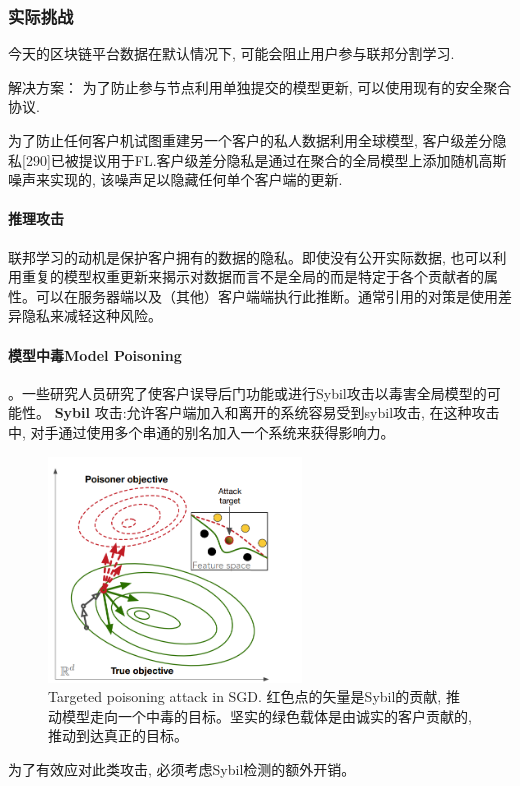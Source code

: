 \documentclass[a4paper]{article}
\begin{document}
\paragraph{}
 
    \subsubsection{实际挑战}

今天的区块链平台数据在默认情况下, 可能会阻止用户参与联邦分割学习.

解决方案：
为了防止参与节点利用单独提交的模型更新, 可以使用现有的安全聚合协议.

为了防止任何客户机试图重建另一个客户的私人数据利用全球模型, 客户级差分隐私[290]已被提议用于FL.客户级差分隐私是通过在聚合的全局模型上添加随机高斯噪声来实现的, 该噪声足以隐藏任何单个客户端的更新.

\paragraph{推理攻击} 联邦学习的动机是保护客户拥有的数据的隐私。即使没有公开实际数据, 也可以利用重复的模型权重更新来揭示对数据而言不是全局的而是特定于各个贡献者的属性。可以在服务器端以及（其他）客户端端执行此推断。通常引用的对策是使用差异隐私来减轻这种风险。

\paragraph{模型中毒Model Poisoning}。一些研究人员研究了使客户误导后门功能或进行Sybil攻击以毒害全局模型的可能性。
 \textbf{Sybil} 攻击:允许客户端加入和离开的系统容易受到sybil攻击, 在这种攻击中, 对手通过使用多个串通的别名加入一个系统来获得影响力。
\begin{figure}[t]
    \centering    
    \includegraphics[width=0.6\textwidth]{poisoninginSGD.png}
    \caption{Targeted poisoning attack in SGD. 红色点的矢量是Sybil的贡献, 推动模型走向一个中毒的目标。坚实的绿色载体是由诚实的客户贡献的, 推动到达真正的目标。    }
\end{figure}
为了有效应对此类攻击, 必须考虑Sybil检测的额外开销。
\end{document}
